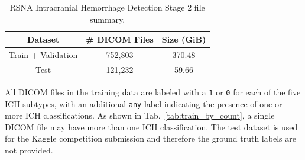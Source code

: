 \documentclass[runningheads]{llncs}
\begin{document}
\begin{table}[htbp]
    \centering
    \tabcolsep=0.21cm
    \caption{RSNA Intracranial Hemorrhage Detection Stage 2 file summary.}
    \label{tab:data_overview}
    \begin{tabular}{|c|c|c|}
        \hline
        Dataset & \# DICOM Files & Size (GiB) \\ \hline
        Train + Validation & 752,803 & 370.48 \\ 
        Test    & 121,232 & 59.66 \\ \hline
    \end{tabular}
\end{table}

All DICOM files in the training data are labeled with a \texttt{1} or \texttt{0} for each of the five ICH subtypes, with an additional \texttt{any} label indicating the presence of one or more ICH classifications.
As shown in Tab.~\ref{tab:train_by_count}, a single DICOM file may have more than one ICH classification.
The test dataset is used for the Kaggle competition submission and therefore the ground truth labels are not provided.
\end{document}
